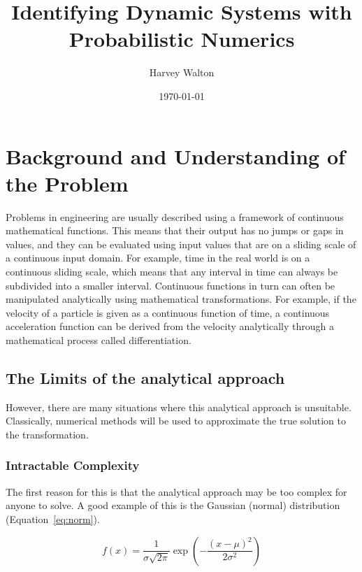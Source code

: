 \documentclass[12pt]{article}
\title{Identifying Dynamic Systems with Probabilistic Numerics}
\author{Harvey Walton}
\date{\today}
\begin{document}

    \thispagestyle{empty}
    


    \tableofcontents
    \newpage


    \section{Background and Understanding of the Problem}


    Problems in engineering are usually described using a framework of continuous mathematical functions.
    This means that their output has no jumps or gaps in values, and they can be evaluated using input values that are on a sliding scale of a continuous input domain.
    For example, time in the real world is on a continuous sliding scale, which means that any interval in time can always be subdivided into a smaller interval.
    Continuous functions in turn can often be manipulated analytically using mathematical transformations.
    For example, if the velocity of a particle is given as a continuous function of time, a continuous acceleration function can be derived from the velocity analytically through a mathematical process called differentiation.

    \subsection{The Limits of the analytical approach}

    However, there are many situations where this analytical approach is unsuitable.
    Classically, numerical methods will be used to approximate the true solution to the transformation.

    \subsubsection{Intractable Complexity}\label{subsubsec:int-comp}

    The first reason for this is that the analytical approach may be too complex for anyone to solve.
    A good example of this is the Gaussian (normal) distribution (Equation~\ref{eq:norm}). %

    \begin{equation}
        f(x) = \frac{1}{\sigma\sqrt{2\pi}} \exp\left(-\frac{(x - \mu)^2}{2\sigma^2}\right)\label{eq:norm}
    \end{equation}
\end{document}
